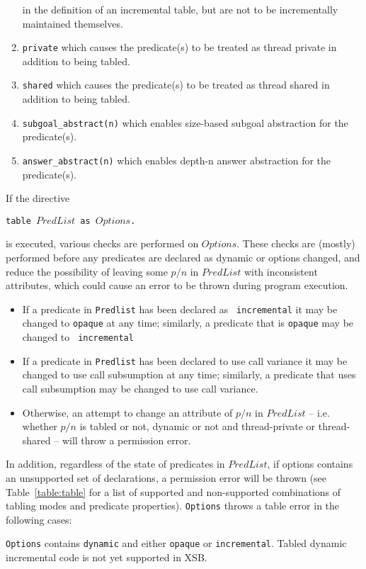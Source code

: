 \begin{description}
\begin{enumerate}
  in the definition of an incremental table, but are not to be
  incrementally maintained themselves.  
%
\item {\tt private} which causes the predicate(s) to be treated as
  thread private in addition to being tabled.
%
\item {\tt shared} which causes the predicate(s) to be treated as
  thread shared in addition to being tabled.
%
\item {\tt subgoal\_abstract(n)}  which enables size-based subgoal abstraction for the predicate(s).
%
\item {\tt answer\_abstract(n)} which enables depth-n answer
  abstraction for the predicate(s).
%
\ei
\ei
\end{enumerate}

If the directive 

{\tt  table $PredList$ as $Options$.}

is executed, various checks are performed on $Options$.  These checks
are (mostly) performed before any predicates are declared as dynamic
or options changed, and reduce the possibility of leaving some $p/n$
in $PredList$ with inconsistent attributes, which could cause an error
to be thrown during program execution.
%
\begin{itemize}
\item If a predicate in {\tt Predlist} has been declared as {\tt
  incremental} it may be changed to {\tt opaque} at any time;
  similarly, a predicate that is {\tt opaque} may be changed to {\tt
    incremental}
%
\item If a predicate in {\tt Predlist} has been declared to use call
  variance it may be changed to use call subsumption at any time;
  similarly, a predicate that uses call subsumption may be changed to
  use call variance.
%
\item Otherwise, an attempt to change an attribute of $p/n$ in
  $PredList$ -- i.e. whether $p/n$ is tabled or not, dynamic or not
  and thread-private or thread-shared -- will throw a permission
  error.  
\end{itemize}

In addition, regardless of the state of predicates in $PredList$, if
options contains an unsupported set of declarations, a permission error
will be thrown (see Table~\ref{table:table} for a list of supported
and non-supported combinations of tabling modes and predicate
properties).  {\tt Options} throws a table error in the following
cases:
%
\bi
\item {\tt Options} contains {\tt dynamic} and either {\tt opaque} or
  {\tt incremental}.  Tabled dynamic incremental code is not yet
  supported in XSB.


\end{description}
